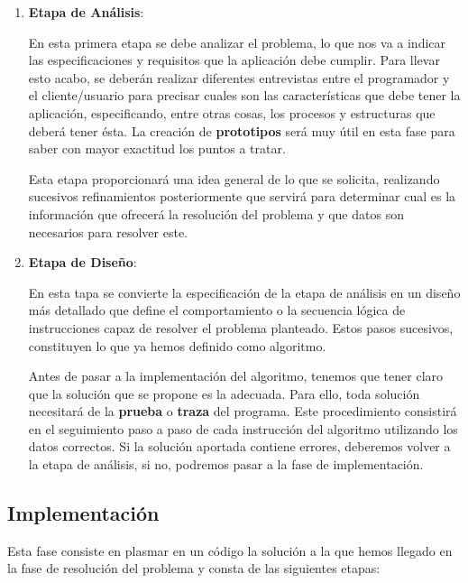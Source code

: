 \begin{enumerate}
    \item \textbf{Etapa de Análisis}:

    En esta primera etapa se debe analizar el problema, lo que nos va a indicar las especificaciones y requisitos que la aplicación debe cumplir. Para llevar esto acabo, se deberán realizar diferentes entrevistas entre el programador y el cliente/usuario para precisar cuales son las características que debe tener la aplicación, especificando, entre otras cosas, los procesos y estructuras que deberá tener ésta. La creación de \textbf{prototipos} será muy útil en esta fase para saber con mayor exactitud los puntos a tratar.

    Esta etapa proporcionará una idea general de lo que se solicita, realizando sucesivos refinamientos posteriormente que servirá para determinar cual es la información que ofrecerá la resolución del problema y que datos son necesarios para resolver este.

    \item \textbf{Etapa de Diseño}:

    En esta tapa se convierte la especificación de la etapa de análisis en un diseño más detallado que define el comportamiento o la secuencia lógica de instrucciones capaz de resolver el problema planteado. Estos pasos sucesivos, constituyen lo que ya hemos definido como algoritmo.

    Antes de pasar a la implementación del algoritmo, tenemos que tener claro que la solución que se propone es la adecuada. Para ello, toda solución necesitará de la \textbf{prueba} o \textbf{traza} del programa. Este procedimiento consistirá en el seguimiento paso a paso de cada instrucción del algoritmo utilizando los datos correctos. Si la solución aportada contiene errores, deberemos volver a la etapa de análisis, si no, podremos pasar a la fase de implementación.
\end{enumerate}

\subsection{Implementación}
Esta fase consiste en plasmar en un código la solución a la que hemos llegado en la fase de resolución del problema y consta de las siguientes etapas:

